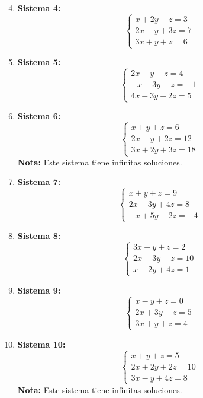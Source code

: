 \documentclass{article}
\begin{document}
\begin{enumerate}
    \setcounter{enumi}{3}

    \item \textbf{Sistema 4:}
    \[
    \begin{cases}
      x + 2y - z = 3 \\
      2x - y + 3z = 7 \\
      3x + y + z = 6
    \end{cases}
    \]

    \item \textbf{Sistema 5:}
    \[
    \begin{cases}
      2x - y + z = 4 \\
      -x + 3y - z = -1 \\
      4x - 3y + 2z = 5
    \end{cases}
    \]

    \item \textbf{Sistema 6:}
    \[
    \begin{cases}
      x + y + z = 6 \\
      2x - y + 2z = 12 \\
      3x + 2y + 3z = 18
    \end{cases}
    \]
    \textbf{Nota:} Este sistema tiene infinitas soluciones.

    \item \textbf{Sistema 7:}
    \[
    \begin{cases}
      x + y + z = 9 \\
      2x - 3y + 4z = 8 \\
      -x + 5y - 2z = -4
    \end{cases}
    \]

    \item \textbf{Sistema 8:}
    \[
    \begin{cases}
      3x - y + z = 2 \\
      2x + 3y - z = 10 \\
      x - 2y + 4z = 1
    \end{cases}
    \]

    \item \textbf{Sistema 9:}
    \[
    \begin{cases}
      x - y + z = 0 \\
      2x + 3y - z = 5 \\
      3x + y + z = 4
    \end{cases}
    \]

    \item \textbf{Sistema 10:}
    \[
    \begin{cases}
      x + y + z = 5 \\
      2x + 2y + 2z = 10 \\
      3x - y + 4z = 8
    \end{cases}
    \]
    \textbf{Nota:} Este sistema tiene infinitas soluciones.
\end{enumerate}
\end{document}
